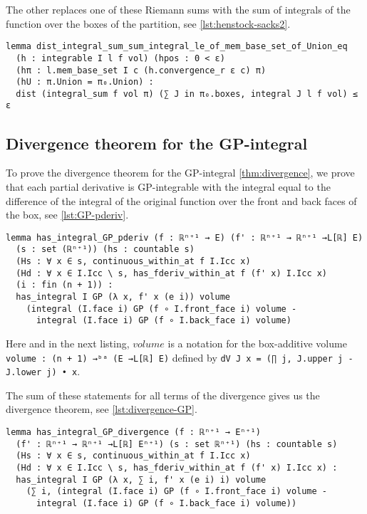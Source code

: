 \documentclass[a4paper, UKenglish,cleveref, autoref, thm-restate]{lipics-v2021}
\begin{document}
The other replaces one of these Riemann sums with the sum of integrals
of the function over the boxes of the partition, see
\autoref{lst:henstock-sacks2}.

\begin{lstlisting}[caption={Henstock-Sacks inequality on the distance between an integral sum and a sum of integrals},label=lst:henstock-sacks2]
lemma dist_integral_sum_sum_integral_le_of_mem_base_set_of_Union_eq
  (h : integrable I l f vol) (hpos : 0 < ε)
  (hπ : l.mem_base_set I c (h.convergence_r ε c) π)
  (hU : π.Union = π₀.Union) :
  dist (integral_sum f vol π) (∑ J in π₀.boxes, integral J l f vol) ≤ ε
\end{lstlisting}

\subsection{Divergence theorem for the GP-integral}%
\label{sec:diverg-theor-gp}

To prove the divergence theorem for the GP-integral
\autoref{thm:divergence}, we prove that each partial derivative is
GP-integrable with the integral equal to the difference of the
integral of the original function over the front and back faces of the
box, see \autoref{lst:GP-pderiv}.

\begin{lstlisting}[caption={Key lemma for the divergence theorem for the GP-integral},label=lst:GP-pderiv]
lemma has_integral_GP_pderiv (f : ℝⁿ⁺¹ → E) (f' : ℝⁿ⁺¹ → ℝⁿ⁺¹ →L[ℝ] E)
  (s : set (ℝⁿ⁺¹)) (hs : countable s)
  (Hs : ∀ x ∈ s, continuous_within_at f I.Icc x)
  (Hd : ∀ x ∈ I.Icc \ s, has_fderiv_within_at f (f' x) I.Icc x)
  (i : fin (n + 1)) :
  has_integral I GP (λ x, f' x (e i)) volume
    (integral (I.face i) GP (f ∘ I.front_face i) volume -
      integral (I.face i) GP (f ∘ I.back_face i) volume)
\end{lstlisting}

Here and in the next listing, \(volume\) is a notation for the
box-additive volume \lstinline=volume : (n + 1) →ᵇᵃ (E →L[ℝ] E)=
defined by \lstinline+dV J x = (∏ j, J.upper j - J.lower j) • x+.

The sum of these statements for all terms of the divergence gives us
the divergence theorem, see \autoref{lst:divergence-GP}.

\begin{lstlisting}[caption={The divergence theorem for the GP-integral},label=lst:divergence-GP]
lemma has_integral_GP_divergence (f : ℝⁿ⁺¹ → Eⁿ⁺¹)
  (f' : ℝⁿ⁺¹ → ℝⁿ⁺¹ →L[ℝ] Eⁿ⁺¹) (s : set ℝⁿ⁺¹) (hs : countable s)
  (Hs : ∀ x ∈ s, continuous_within_at f I.Icc x)
  (Hd : ∀ x ∈ I.Icc \ s, has_fderiv_within_at f (f' x) I.Icc x) :
  has_integral I GP (λ x, ∑ i, f' x (e i) i) volume
    (∑ i, (integral (I.face i) GP (f ∘ I.front_face i) volume -
      integral (I.face i) GP (f ∘ I.back_face i) volume))
\end{lstlisting}
\end{document}
